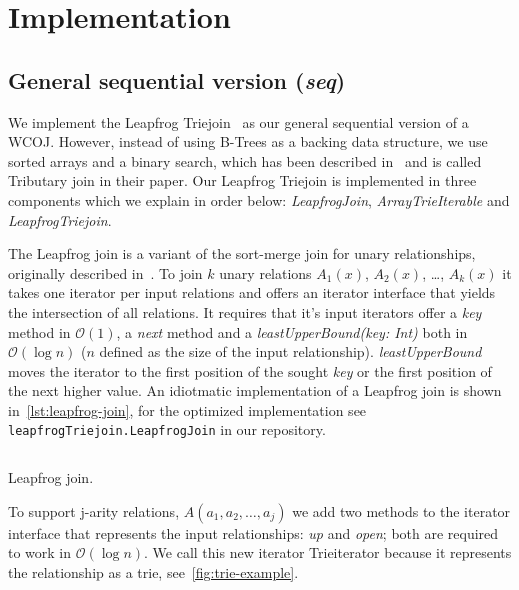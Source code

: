 \section{Implementation}\label{sec:implementation}

\subsection{General sequential version (\textit{seq})}\label{subsec:general-sequential-version}
We implement the Leapfrog Triejoin~\cite{leapfrog} as our general sequential version of a WCOJ.
However, instead of using B-Trees as a backing data structure, we use sorted arrays and a binary
search, which has been described in~\cite{myria-detailed} and is called
Tributary join in their paper.
Our Leapfrog Triejoin is implemented in three components which we explain in order below: \textit{LeapfrogJoin}, \textit{ArrayTrieIterable} and
\textit{LeapfrogTriejoin}.

The Leapfrog join is a variant of the sort-merge join for unary relationships, originally described in~\cite{leapfrog1,leapfrog2}. %
To join $k$ unary relations $A_1(x)$, $A_2(x)$, \dots, $A_k(x)$ it takes one iterator per input relations and offers an iterator
interface that yields the intersection of all relations.
It requires that it's input iterators offer a \textit{key} method in $\mathcal{O}(1)$, a \textit{next} method and
a \textit{leastUpperBound(key: Int)} both in $\mathcal{O} (\log n)$ ($n$ defined as the size of the input relationship).
\textit{leastUpperBound} moves the iterator to the first position of the sought \textit{key} or the first position of the
next higher value.
An idiotmatic implementation of a Leapfrog join is shown in~\cref{lst:leapfrog-join}, for the optimized implementation see
\texttt{leapfrogTriejoin.LeapfrogJoin} in our repository.  %

\begin{listing}[H]
    \inputminted[linenos=true]{scala}{code/LeapfrogJoin.scala}
    \caption{Leapfrog join.}
    \label{lst:leapfrog-join}
\end{listing}

To support j-arity relations, $A(a_1, a_2, \dots, a_j)$ we add two methods to the iterator interface that represents the input
relationships: \textit{up} and \textit{open}; both are required to work in $\mathcal{O} (\log n)$.
We call this new iterator Trieiterator because it represents the relationship as a trie, see~\cref{fig:trie-example}.

